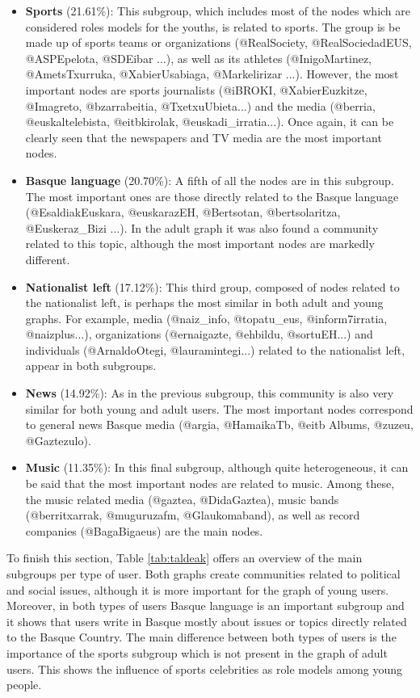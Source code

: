 \documentclass[information,article,submit,moreauthors,pdftex,10pt,a4paper]{Definitions/mdpi}
\begin{document}
\begin{itemize}
\item \textbf{Sports} (21.61\%): This subgroup, which includes most of the nodes which are considered roles models for the youths, is related to sports. The group is be made up of sports teams or organizations (@RealSociety, @RealSociedadEUS, @ASPEpelota, @SDEibar ...), as well as its athletes (@InigoMartinez, @AmetsTxurruka, @XabierUsabiaga, @Markelirizar ...). However, the most important nodes are sports journalists (@iBROKI, @XabierEuzkitze, @Imagreto, @bzarrabeitia, @TxetxuUbieta...) and the media (@berria, @euskaltelebista, @eitbkirolak, @euskadi\_irratia...). Once again, it can be clearly seen that the newspapers and TV media are the most important nodes.

\item \textbf{Basque language} (20.70\%): A fifth of all the nodes are in this subgroup. The most important ones are those directly related to the Basque language (@EsaldiakEuskara, @euskarazEH, @Bertsotan, @bertsolaritza, @Euskeraz\_Bizi ...). In the adult graph it was also found a community related to this topic, although the most important nodes are markedly different.

\item \textbf{Nationalist left} (17.12\%): This third group, composed of nodes related to the nationalist left, is perhaps the most similar in both adult and young graphs. For example, media (@naiz\_info, @topatu\_eus, @inform7irratia, @naizplus...), organizations (@ernaigazte, @ehbildu, @sortuEH...) and individuals (@ArnaldoOtegi, @lauramintegi...) related to the nationalist left, appear in both subgroups.

\item \textbf{News} (14.92\%): As in the previous subgroup, this community is also very similar for both young and adult users. The most important nodes correspond to general news Basque media (@argia, @HamaikaTb, @eitb Albums, @zuzeu, @Gaztezulo).

\item \textbf{Music} (11.35\%): In this final subgroup, although quite heterogeneous, it can be said that the most important nodes are related to music. Among these, the music related media (@gaztea, @DidaGaztea), music bands (@berritxarrak, @muguruzafm, @Glaukomaband), as well as record companies (@BagaBigaeus) are the main nodes.

\end{itemize}

To finish this section, Table \ref{tab:taldeak} offers an overview of the main subgroups per type of user. Both graphs create communities related to political and social issues, although it is more important for the graph of young users. Moreover, in both types of users Basque language is an important subgroup and it shows that users write in Basque mostly about issues or topics directly related to the Basque Country. The main difference between both types of users is the importance of the sports subgroup which is not present in the graph of adult users. This shows the influence of sports celebrities as role models among young people.
\end{document}
